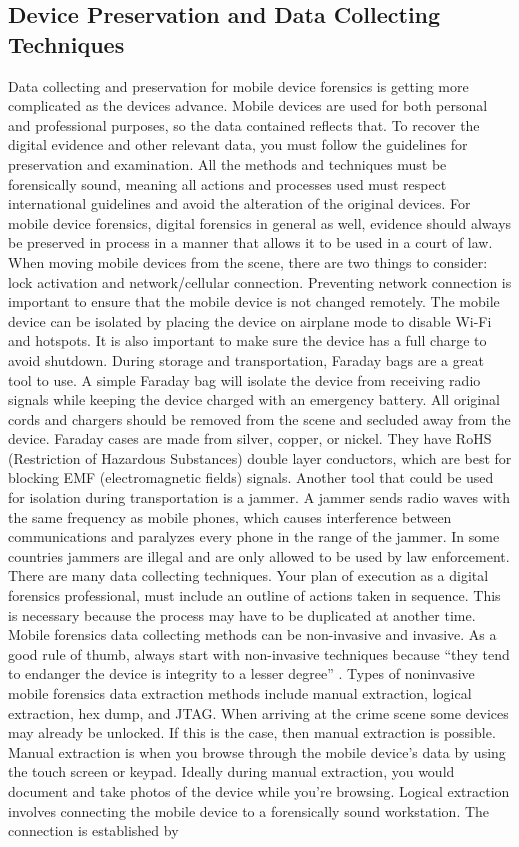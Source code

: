 \documentclass[acmlarge]{style/acmart}
\begin{document}
\subsection{Device Preservation and Data Collecting Techniques}
Data collecting and preservation for mobile device forensics is getting more complicated as the devices advance.  Mobile devices are used for both personal and professional purposes, so the data contained reflects that.  To recover the digital evidence and other relevant data, you must follow the guidelines for preservation and examination.  All the methods and techniques must be forensically sound, meaning all actions and processes used must respect international guidelines and avoid the alteration of the original devices.  For mobile device forensics, digital forensics in general as well, evidence should always be preserved in process in a manner that allows it to be used in a court of law.  When moving mobile devices from the scene, there are two things to consider: lock activation and network/cellular connection.  Preventing network connection is important to ensure that the mobile device is not changed remotely.  The mobile device can be isolated by placing the device on airplane mode to disable Wi-Fi and hotspots.  It is also important to make sure the device has a full charge to avoid shutdown.  During storage and transportation, Faraday bags are a great tool to use.  A simple Faraday bag will isolate the device from receiving radio signals while keeping the device charged with an emergency battery.  All original cords and chargers should be removed from the scene and secluded away from the device.  Faraday cases are made from silver, copper, or nickel.  They have RoHS (Restriction of Hazardous Substances) double layer conductors, which are best for blocking EMF (electromagnetic fields) signals.  Another tool that could be used for isolation during transportation is a jammer.  A jammer sends radio waves with the same frequency as mobile phones, which causes interference between communications and paralyzes every phone in the range of the jammer.  In some countries jammers are illegal and are only allowed to be used by law enforcement.  There are many data collecting techniques.  Your plan of execution as a digital forensics professional, must include an outline of actions taken in sequence.  This is necessary because the process may have to be duplicated at another time.  Mobile forensics data collecting methods can be non-invasive and invasive.  As a good rule of thumb, always start with non-invasive techniques because “they tend to endanger the device is integrity to a lesser degree” \cite{Kostadinov_2019}.  Types of noninvasive mobile forensics data extraction methods include manual extraction, logical extraction, hex dump, and JTAG.  When arriving at the crime scene some devices may already be unlocked.  If this is the case, then manual extraction is possible.  Manual extraction is when you browse through the mobile device’s data by using the touch screen or keypad.  Ideally during manual extraction, you would document and take photos of the device while you're browsing.  Logical extraction involves connecting the mobile device to a forensically sound workstation.  The connection is established by 
\end{document}
